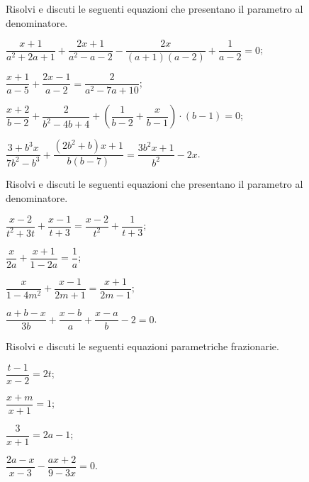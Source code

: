 \begin{esercizio}[\Ast]
\label{ese:17.50}
Risolvi e discuti le seguenti equazioni che presentano il parametro al denominatore.
\begin{enumeratea}
\spazielenx
 \item $\dfrac{x+1}{a^{2}+2a+1}+\dfrac{2x+1}{a^{2}-a-2}-\dfrac{2x}{(a+1)(a-2)}+\dfrac{1}{a-2}=0$;
 \item $\dfrac{x+1}{a-5}+\dfrac{2x-1}{a-2}=\dfrac{2}{a^{2}-7a+10}$;
 \item $\dfrac{x+2}{b-2}+\dfrac{2}{b^{2}-4b+4}+\left(\dfrac{1}{b-2}+\dfrac{x}{b-1}\right)\cdot (b-1)=0$;
 \item $\dfrac{3+b^{3}x}{7b^{2}-b^{3}}+\dfrac{(2b^{2}+b)x+1}{b(b-7)}=\dfrac{3b^{2}x+1}{b^{2}}-2x$.
\end{enumeratea}
\end{esercizio}
\pagebreak
\begin{esercizio}[\Ast]
\label{ese:17.51}
Risolvi e discuti le seguenti equazioni che presentano il parametro al denominatore.
\begin{multicols}{2}
\begin{enumeratea}
 \item $\dfrac{x-2}{t^{2}+3t}+\dfrac{x-1}{t+3}=\dfrac{x-2}{t^{2}}+\dfrac{1}{t+3}$;
 \item $\dfrac{x}{2a}+\dfrac{x+1}{1-2a}=\dfrac{1}{a}$;
 \item $\dfrac{x}{1-4m^{2}}+\dfrac{x-1}{2m+1}=\dfrac{x+1}{2m-1}$;
 \item $\dfrac{a+b-x}{3b}+\dfrac{x-b}{a}+\dfrac{x-a}{b}-2=0$.
\end{enumeratea}
\end{multicols}
\end{esercizio}


\begin{esercizio}[\Ast]
\label{ese:17.52}
Risolvi e discuti le seguenti equazioni parametriche frazionarie.
\begin{multicols}{2}
\begin{enumeratea}
 \item $\dfrac{t-1}{x-2}=2t$;
 \item $\dfrac{x+m}{x+1}=1$;
 \item $\dfrac{3}{x+1}=2a-1$;
 \item $\dfrac{2a-x}{x-3}-\dfrac{ax+2}{9-3x}=0$.
\end{enumeratea}
\end{multicols}
\end{esercizio}

